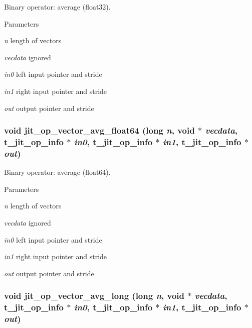 Binary operator: average (float32). 
\begin{DoxyParams}{Parameters}
\item[{\em n}]length of vectors \item[{\em vecdata}]ignored \item[{\em in0}]left input pointer and stride \item[{\em in1}]right input pointer and stride \item[{\em out}]output pointer and stride \end{DoxyParams}
\hypertarget{group__opvecmod_gabc934a68c0591042bf2d2fccd5847f78}{
\subsubsection[{jit\_\-op\_\-vector\_\-avg\_\-float64}]{\setlength{\rightskip}{0pt plus 5cm}void jit\_\-op\_\-vector\_\-avg\_\-float64 (long {\em n}, \/  void $\ast$ {\em vecdata}, \/  {\bf t\_\-jit\_\-op\_\-info} $\ast$ {\em in0}, \/  {\bf t\_\-jit\_\-op\_\-info} $\ast$ {\em in1}, \/  {\bf t\_\-jit\_\-op\_\-info} $\ast$ {\em out})}}
\label{group__opvecmod_gabc934a68c0591042bf2d2fccd5847f78}


Binary operator: average (float64). 
\begin{DoxyParams}{Parameters}
\item[{\em n}]length of vectors \item[{\em vecdata}]ignored \item[{\em in0}]left input pointer and stride \item[{\em in1}]right input pointer and stride \item[{\em out}]output pointer and stride \end{DoxyParams}
\hypertarget{group__opvecmod_gafab6512b1e7755dde911fbb7dc2c2f3f}{
\subsubsection[{jit\_\-op\_\-vector\_\-avg\_\-long}]{\setlength{\rightskip}{0pt plus 5cm}void jit\_\-op\_\-vector\_\-avg\_\-long (long {\em n}, \/  void $\ast$ {\em vecdata}, \/  {\bf t\_\-jit\_\-op\_\-info} $\ast$ {\em in0}, \/  {\bf t\_\-jit\_\-op\_\-info} $\ast$ {\em in1}, \/  {\bf t\_\-jit\_\-op\_\-info} $\ast$ {\em out})}}
\label{group__opvecmod_gafab6512b1e7755dde911fbb7dc2c2f3f}


